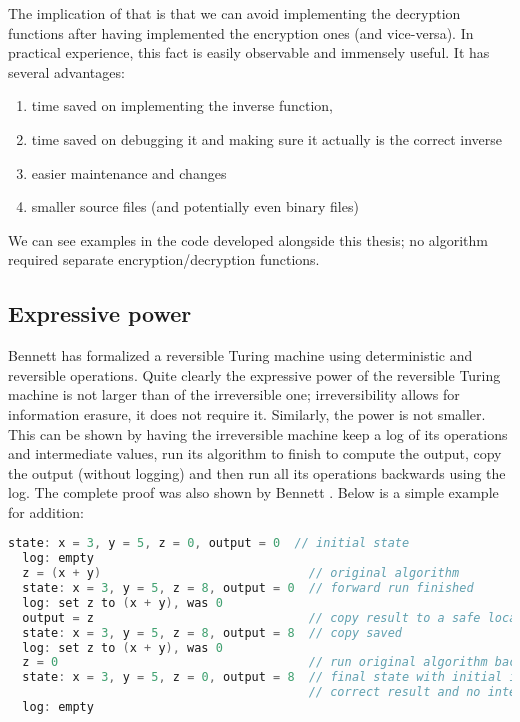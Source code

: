 \documentclass[a4paper,10pt,openright]{memoir}
\begin{document}
The implication of that is that we can avoid implementing the 
decryption functions after having implemented the encryption ones (and 
vice-versa). In practical experience, this fact is easily observable 
and immensely useful. It has several advantages:

\begin{enumerate}
\item time saved on implementing the inverse function,
\item time saved on debugging it and making sure it actually is the correct inverse
\item easier maintenance and changes
\item smaller source files (and potentially even binary files)
\end{enumerate}

We can see examples in the code developed alongside this thesis; no 
algorithm required separate encryption/decryption functions.

\subsection{Expressive power}
\label{sec:expr-power}

Bennett has formalized \cite{Bennett73} a reversible Turing machine 
using deterministic and reversible operations. Quite clearly the 
expressive power of the reversible Turing machine is not larger than of 
the irreversible one; irreversibility allows for information erasure, 
it does not require it. Similarly, the power is not smaller. This can 
be shown by having the irreversible machine keep a log of its 
operations and intermediate values, run its algorithm to finish to 
compute the output, copy the output (without logging) and then run all 
its operations backwards using the log. The complete proof was also 
shown by Bennett \cite{Bennett73}. Below is a simple example for 
addition:

\begin{lstlisting}[language=c]
  state: x = 3, y = 5, z = 0, output = 0  // initial state
  log: empty
  z = (x + y)                             // original algorithm
  state: x = 3, y = 5, z = 8, output = 0  // forward run finished
  log: set z to (x + y), was 0
  output = z                              // copy result to a safe location, log ignored
  state: x = 3, y = 5, z = 8, output = 8  // copy saved
  log: set z to (x + y), was 0
  z = 0                                   // run original algorithm backwards
  state: x = 3, y = 5, z = 0, output = 8  // final state with initial input values, 
                                          // correct result and no intermediate values
  log: empty
\end{lstlisting}
\end{document}

